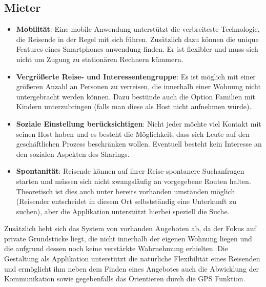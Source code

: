 \subsection{Mieter}
\begin{itemize}
   \item 
   \textbf{Mobilität}: Eine mobile Anwendung unterstützt die verbreiteste Technologie, die Reisende in der Regel mit sich führen. Zusätzlich dazu können die unique Features eines Smartphones anwendung finden.
   Er ist flexibler und muss sich nicht um Zugung zu stationären Rechnern kümmern.

   \item 
   \textbf{Vergrößerte Reise- und Interessentengruppe}: Es ist möglich mit einer größeren Anzahl an Personen zu verreisen, die innerhalb einer Wohnung nicht untergebracht werden können. Dazu bestünde auch die Option Familien mit Kindern unterzubringen (falls man diese als Host nicht aufnehmen würde). 

   \item
   \textbf{Soziale Einstellung berücksichtigen}: Nicht jeder möchte viel Kontakt mit seinen Host haben und es besteht die Möglichkeit, dass sich Leute auf den geschäftlichen Prozess beschränken wollen. Eventuell besteht kein Interesse an den sozialen Aspekten des Sharings.

   \item 
   \textbf{Spontanität}: Reisende können auf ihrer Reise spontanere Suchanfragen starten und müssen sich nicht zwangsläufig an vorgegebene Routen halten. Theoretisch ist dies auch unter bereits vorhanden umständen möglich (Reisender entscheidet in diesem Ort selbstständig eine Unterkunft zu suchen), aber die Applikation unterstützt hierbei speziell die Suche.

\end{itemize}
     

Zusätzlich hebt sich das System von vorhanden Angeboten ab, da der Fokus auf private Grundstücke liegt, die nicht innerhalb der eigenen Wohnung liegen und die aufgrund dessen noch keine verstärkte Wahrnehmung erhielten. Die Gestaltung als Applikation unterstützt die natürliche Flexibilität eines Reisenden und ermöglicht ihm neben dem Finden eines Angebotes auch die Abwicklung der Kommunikation sowie gegebenfalls das Orientieren durch die GPS Funktion. 
